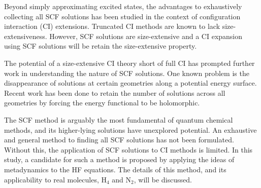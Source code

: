 \documentclass[final,3p,times,twocolumn]{elsarticle}
\begin{document}
Beyond simply approximating excited states, the advantages to exhaustively collecting all SCF solutions has been studied in the context of configuration interaction (CI) extensions.\cite{thom-2009} Truncated CI methods\cite{shavitt} are known to lack size-extensiveness. However, SCF solutions are size-extensive and a CI expansion using SCF solutions will be retain the size-extensive property.

The potential of a size-extensive CI theory short of full CI has prompted further work in understanding the nature of SCF solutions. One known problem is the disappearance of solutions at certain geometries along a potential energy surface.\cite{scuseria-2011,scuseria-2013} Recent work has been done to retain the number of solutions across all geometries by forcing the energy functional to be holomorphic.\cite{thom-2014,thom-2016}

The SCF method is arguably the most fundamental of quantum chemical methods, and its higher-lying solutions have unexplored potential. %
An exhaustive and general method to finding all SCF solutions has not been formulated. Without this, the application of SCF solutions to CI methods is limited. In this study, a candidate for such a method is proposed by applying the ideas of metadynamics to the HF equations. The details of this method, and its applicability to real molecules, H$_4$ and N$_2$, will be discussed.
\end{document}
